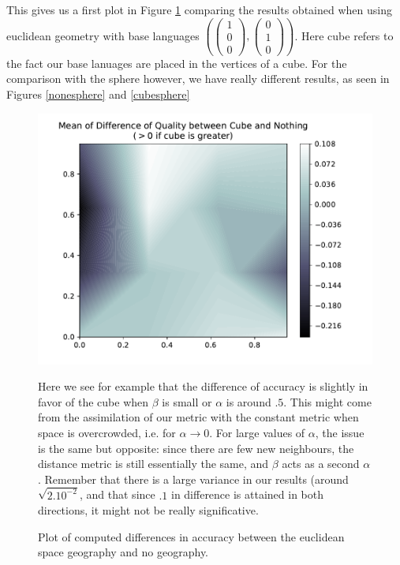\documentclass[math, info, english]{cours}
\begin{document}
This gives us a first plot in Figure \ref{cubenone} comparing the results obtained when using euclidean geometry with base languages $\left( \begin{pmatrix}
	1\\
	0\\
	0
\end{pmatrix}, \begin{pmatrix}
	0\\
	1\\
	0
\end{pmatrix}\right)$. Here cube refers to the fact our base lanuages are placed in the vertices of a cube.
For the comparison with the sphere however, we have really different results, as seen in Figures \ref{nonesphere} and \ref{cubesphere}

\begin{figure}[H]
	\centering
	\hfill
	\begin{minipage}{.45\textwidth}
	\includegraphics[width=\textwidth]{../Figures/qual_diff_cube_none}
	\caption{Plot of computed differences in accuracy between the euclidean space geography and no geography.}
	\label{cubenone}
\end{minipage}
\hfill
\begin{minipage}{.35\textwidth}
Here we see for example that the difference of accuracy is slightly in favor of the cube when $\beta$ is small or $\alpha$ is around $.5$.
This might come from the assimilation of our metric with the constant metric when space is overcrowded, i.e. for $\alpha \to 0$.
For large values of $\alpha$, the issue is the same but opposite: since there are few new neighbours, the distance metric is still essentially the same, and $\beta$ acts as a second $\alpha$.
Remember that there is a large variance in our results (around $\sqrt{2.10^{-2}}$, and that since $.1$ in difference is attained in both directions, it might not be really significative.
\end{minipage}
\hfill
\end{figure}
\end{document}

